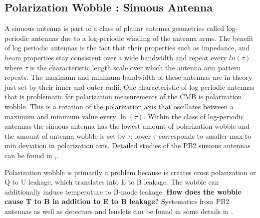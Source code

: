 \subsection{Polarization Wobble : Sinuous Antenna}

A sinuous antenna is part of a class of planar antenna geometries called log-periodic antennas due to a log-periodic winding of the antenna arms. The benefit of log periodic antennas is the fact that their properties such as impedance, and beam properties stay consistent over a wide bandwidth and repeat every $ln(\tau)$ where $\tau$ is the characteristic length scale over which the antenna arm pattern repeats. The maximum and minimum bandwidth of these antennas are in theory just set by their inner and outer radii. One characteristic of log periodic antennas that is problematic for polarization measurements of the CMB is polarization wobble. This is a rotation of the polarization axis that oscillates between a maximum and minimum value every $\ln(\tau)$. Within the class of log-periodic antennas the sinuous antenna has the lowest amount of polarization wobble and the amount of antenna wobble is set by $\tau$: lower $\tau$ corresponds to smaller max to min deviation in polarization axis. Detailed studies of the PB2 sinuous antennas can be found in \cite{Obrient2008},\cite{Edwards2012}.


Polarization wobble is primarily a problem because is creates cross polarization or Q to U leakage, which translates into E to B leakage. The wobble can additionally induce temperature to B-mode leakage. \textbf{How does the wobble cause T to B in addition to E to B leakage?} Systematics from PB2 antennas as well as detectors and lenslets can be found in some details in \cite{TokiThesis}.

